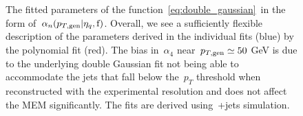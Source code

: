 \begin{figure}
\begin{centering}
 \\
 \\
\caption[The dependence of the transfer function fit parameters on jet kinematics]{The fitted parameters of the function~\cref{eq:double_gaussian}~in the form of~$\alpha_n(p_{T,\mathrm{gen}}|\eta_{q},\mathrm{f})$. Overall, we see a sufficiently flexible description of the parameters derived in the individual fits (blue) by the polynomial fit (red). The bias in~$\alpha_4$ near~$p_{T,\mathrm{gen}} \simeq 50$ GeV is due to the underlying double Gaussian fit not being able to accommodate the jets that fall below the~$p_T$ threshold when reconstructed with the experimental resolution and does not affect the MEM significantly. The fits are derived using~\ttbar+jets simulation.}
\label{fig:transfer_acrossbin}
\end{centering}
\end{figure}

